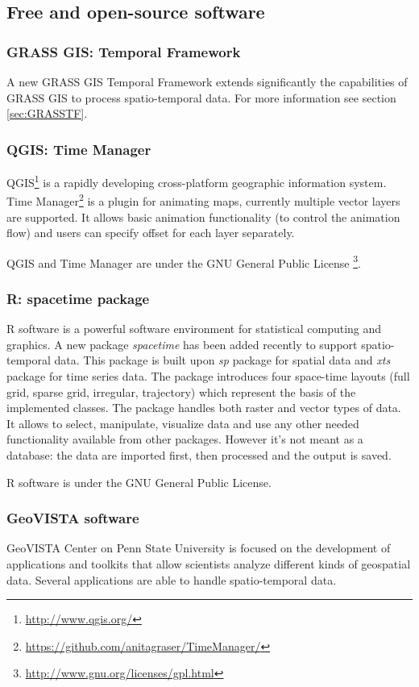 \documentclass[a4paper,12pt,oneside]{book}
\begin{document}
\subsection{Free and open-source software}
\subsubsection{GRASS GIS: Temporal Framework}
A new GRASS GIS Temporal Framework extends significantly the capabilities of GRASS GIS
to process spatio-temporal data. For more information see section \ref{sec:GRASSTF}.

\subsubsection{QGIS: Time Manager}
QGIS\footnote{\url{http://www.qgis.org/}} is a rapidly developing cross-platform
geographic information system. Time Manager\footnote{\url{https://github.com/anitagraser/TimeManager/}}
is a plugin for animating maps, currently multiple vector layers are supported.
It allows basic animation functionality (to control the animation flow) and
users can specify offset for each layer separately.

QGIS and Time Manager are under the GNU General Public License%
\footnote{\url{http://www.gnu.org/licenses/gpl.html}}.

\subsubsection{R: spacetime package}
R software is a powerful software environment for statistical computing and graphics.
A new package \emph{spacetime} has been added recently \cite{PebesmaR} to support spatio-temporal data.
This package is built upon \emph{sp} package for spatial data and
\emph{xts} package for time series data.
The package introduces four space-time layouts (full grid, sparse grid, irregular, trajectory)
which represent the basis of the implemented classes.
The package handles both raster and vector types of data.
It allows to select, manipulate, visualize data and use any other needed functionality
available from other packages. However it's not meant as a database:
the data are imported first, then processed and the output is saved.

R software is under the GNU General Public License.

\subsubsection{GeoVISTA software}
GeoVISTA Center on Penn State University is focused on the development of applications
and toolkits that allow scientists analyze different kinds of geospatial data.
Several applications are able to handle spatio-temporal data.
\end{document}
